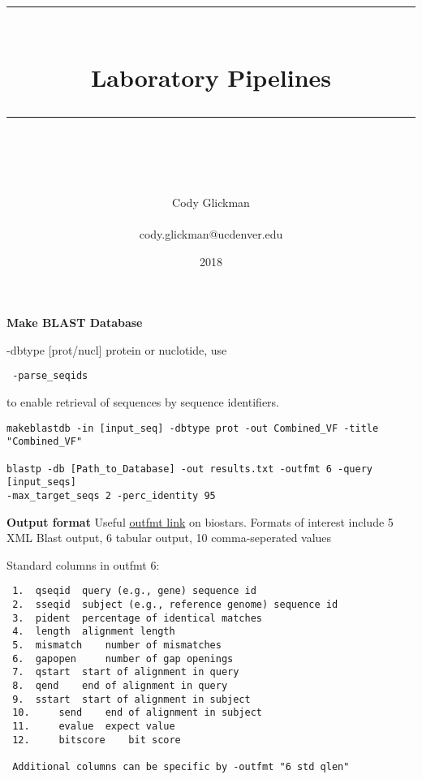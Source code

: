 \documentclass[idxtotoc,hyperref,openany,oneside]{labbook} %
\newcommand{\HRule}{\rule{\linewidth}{0.5mm}} %
\begin{document}

\frontmatter %
\title{
\begin{center}
\HRule \\[0.4cm]
{\Huge \bfseries Laboratory Pipelines \\[0.5cm] \Large} %
\HRule \\[1.5cm]
\end{center}
}
\author{\Huge Cody Glickman \\ \\ \LARGE cody.glickman@ucdenver.edu \\[2cm]} %
\date{2018} %
\maketitle

\tableofcontents

\mainmatter %



\textbf{Make BLAST Database}

-dbtype [prot/nucl] protein or nuclotide, 
use \begin{verbatim} -parse_seqids \end{verbatim} to enable retrieval 
of sequences by sequence identifiers. 


\begin{verbatim}
makeblastdb -in [input_seq] -dbtype prot -out Combined_VF -title "Combined_VF"

blastp -db [Path_to_Database] -out results.txt -outfmt 6 -query [input_seqs]
-max_target_seqs 2 -perc_identity 95 
\end{verbatim}

\textbf{Output format}
Useful \href{https://www.biostars.org/p/88944/}{outfmt link} on biostars. Formats of interest include 5 XML Blast output, 6 tabular output, 10 comma-seperated values

Standard columns in outfmt 6:
\begin{verbatim}
 1.	 qseqid	 query (e.g., gene) sequence id
 2.	 sseqid	 subject (e.g., reference genome) sequence id
 3.	 pident	 percentage of identical matches
 4.	 length	 alignment length
 5.	 mismatch	 number of mismatches
 6.	 gapopen	 number of gap openings
 7.	 qstart	 start of alignment in query
 8.	 qend	 end of alignment in query
 9.	 sstart	 start of alignment in subject
 10.	 send	 end of alignment in subject
 11.	 evalue	 expect value
 12.	 bitscore	 bit score
 
 Additional columns can be specific by -outfmt "6 std qlen"
\end{verbatim}
\end{document}

